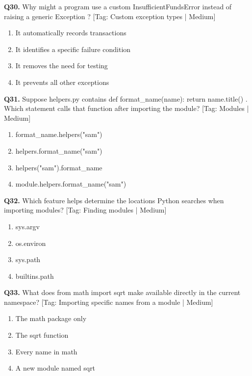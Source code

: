 \vspace{2mm}
\noindent\textbf{Q30.} Why might a program use a custom InsufficientFundsError instead of raising a generic Exception ? \hfill [Tag: Custom exception types | Medium]
\begin{enumerate}[label=(\alph*),topsep=2pt,itemsep=1pt,partopsep=0pt,parsep=0pt]
    \item {It automatically records transactions}
    \item {It identifies a specific failure condition}
    \item {It removes the need for testing}
    \item {It prevents all other exceptions}
\end{enumerate}
\vspace{2mm}
\noindent\textbf{Q31.} Suppose helpers.py contains def format\_name(name): return name.title() . Which statement calls that function after importing the module? \hfill [Tag: Modules | Medium]
\begin{enumerate}[label=(\alph*),topsep=2pt,itemsep=1pt,partopsep=0pt,parsep=0pt]
    \item {format\_name.helpers("sam")}
    \item {helpers.format\_name("sam")}
    \item {helpers("sam").format\_name}
    \item {module.helpers.format\_name("sam")}
\end{enumerate}
\vspace{2mm}
\noindent\textbf{Q32.} Which feature helps determine the locations Python searches when importing modules? \hfill [Tag: Finding modules | Medium]
\begin{enumerate}[label=(\alph*),topsep=2pt,itemsep=1pt,partopsep=0pt,parsep=0pt]
    \item {sys.argv}
    \item {os.environ}
    \item {sys.path}
    \item {builtins.path}
\end{enumerate}
\vspace{2mm}
\noindent\textbf{Q33.} What does from math import sqrt make available directly in the current namespace? \hfill [Tag: Importing specific names from a module | Medium]
\begin{enumerate}[label=(\alph*),topsep=2pt,itemsep=1pt,partopsep=0pt,parsep=0pt]
    \item {The math package only}
    \item {The sqrt function}
    \item {Every name in math}
    \item {A new module named sqrt}
\end{enumerate}
